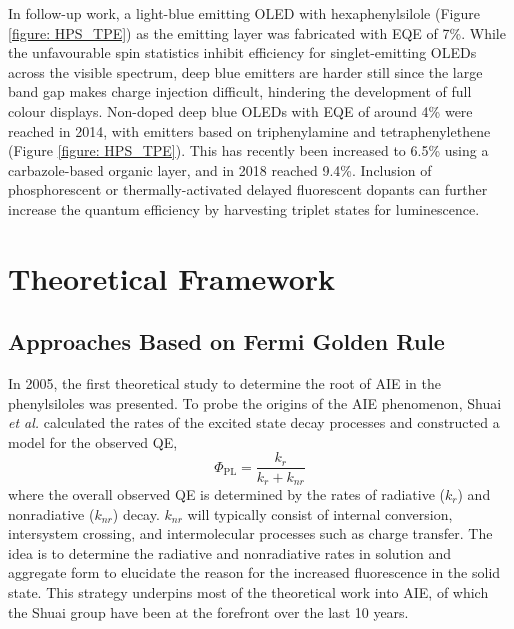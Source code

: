 In follow-up work, a light-blue emitting \ac{OLED} with hexaphenylsilole (Figure \ref{figure: HPS_TPE}) as the emitting layer was fabricated with \ac{EQE} of 7\%.\cite{Chen2003} While the unfavourable spin statistics inhibit efficiency for singlet-emitting \acp{OLED} across the visible spectrum, deep blue emitters are harder still since the large band gap makes charge injection difficult, hindering the development of full colour displays. Non-doped deep blue \acp{OLED} with \ac{EQE} of around 4\% were reached in 2014, with emitters based on triphenylamine and tetraphenylethene (Figure \ref{figure: HPS_TPE}).\cite{Huang2014,Huang2014a} This has recently been increased to 6.5\% using a carbazole-based organic layer, and in 2018 reached 9.4\%.\cite{KumarKonidena2017,Tang2018} Inclusion of phosphorescent or thermally-activated delayed fluorescent dopants can further increase the quantum efficiency by harvesting triplet states for luminescence.\cite{Zhu2018}


\section{Theoretical Framework}\label{section: lom theory}
\subsection{Approaches Based on Fermi Golden Rule}\label{section: lom FGR}
In 2005, the first theoretical study to determine the root of AIE in the phenylsiloles was presented.\cite{Yui2005} To probe the origins of the AIE phenomenon, Shuai \textit{et al.} calculated the rates of the excited state decay processes and constructed a model for the observed \ac{QE}, 
\begin{equation}\label{equation: QE}
    \Phi_{\mathrm{PL}}=\frac{k_{r}}{k_{r}+k_{nr}}
\end{equation}
where the overall observed \ac{QE} is determined by the rates of radiative ($k_{r}$) and nonradiative ($k_{nr}$) decay. $k_{nr}$ will typically consist of internal conversion, intersystem crossing, and intermolecular processes such as charge transfer. The idea is to determine the radiative and nonradiative rates in solution and aggregate form to elucidate the reason for the increased fluorescence in the solid state. This strategy underpins most of the theoretical work into AIE, of which the Shuai group have been at the forefront over the last 10 years. 

